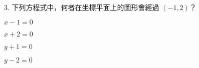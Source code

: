 \documentclass[12pt]{article}
\begin{document}
\begin{problem}
  \item[3.] 下列方程式中，何者在坐標平面上的圖形會經過 $(-1, 2)$？
  \begin{choices}
    \item $x - 1 = 0$
    \item $x + 2 = 0$
    \item $y + 1 = 0$
    \item $y - 2 = 0$
  \end{choices}
\end{problem}
\end{document}
